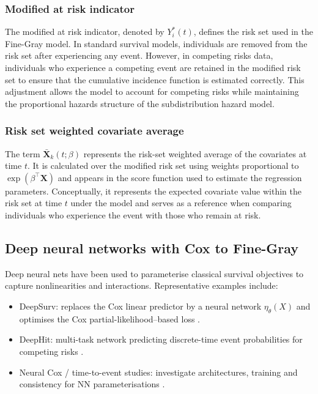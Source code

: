 \documentclass[a4paper,twoside,12pt]{report}
\begin{document}
\subsubsection{Modified at risk indicator}
The modified at risk indicator, denoted by $Y_i^*(t)$, defines the risk set used in the Fine-Gray model. In standard survival models, individuals are removed from the risk set after experiencing any event. However, in competing risks data, individuals who experience a competing event are retained in the modified risk set to ensure that the cumulative incidence function is estimated correctly. This adjustment allows the model to account for competing risks while maintaining the proportional hazards structure of the subdistribution hazard model.

\subsubsection{Risk set weighted covariate average}
The term $\bar{\boldsymbol{X}}_k(t;\beta)$ represents the risk-set weighted average of the covariates at time $t$. It is calculated over the modified risk set using weights proportional to $\exp(\beta^\top \boldsymbol{X})$ and appears in the score function used to estimate the regression parameters. Conceptually, it represents the expected covariate value within the risk set at time $t$ under the model and serves as a reference when comparing individuals who experience the event with those who remain at risk.

\subsection{Deep neural networks with Cox to Fine-Gray}

Deep neural nets have been used to parameterise classical survival objectives to capture nonlinearities and interactions. Representative examples include:

\begin{itemize}
  \item DeepSurv: replaces the Cox linear predictor by a neural network \( \eta_\theta(X)\) and optimises the Cox partial-likelihood–based loss \citep{Katzman2018}.
  \item DeepHit: multi-task network predicting discrete-time event probabilities for competing risks \citep{Lee2018}.
  \item Neural Cox / time-to-event studies: investigate architectures, training and consistency for NN parameterisations \citep{kvamme2019,Wang2020}.
\end{itemize}
\end{document}
